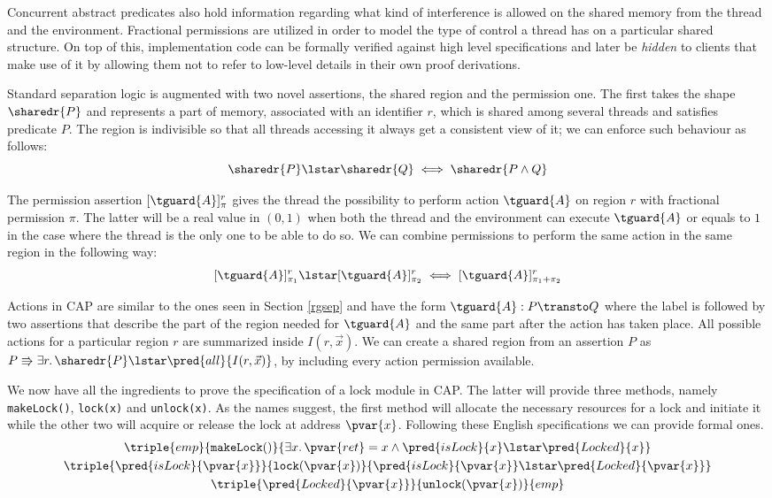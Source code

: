 Concurrent abstract predicates also hold information regarding what kind of interference is allowed on the shared memory from the thread and the environment. Fractional permissions \cite{fractional} are utilized in order to model the type of control a thread has on a particular shared structure. On top of this, implementation code can be formally verified against high level specifications and later be \textit{hidden} to clients that make use of it by allowing them not to refer to low-level details in their own proof derivations.

Standard separation logic is augmented with two novel assertions, the shared region and the permission one. The first takes the shape $\sharedr{P}$ and represents a part of memory, associated with an identifier $r$, which is shared among several threads and satisfies predicate $P$. The region is indivisible so that all threads accessing it always get a consistent view of it; we can enforce such behaviour as follows:
\[
	\sharedr{P} \lstar \sharedr{Q} \iff \sharedr{P \land Q}
\]

The permission assertion $[\tguard{A}]_\pi^r$ gives the thread the possibility to perform action $\tguard{A}$ on region $r$ with fractional permission $\pi$. The latter will be a real value in $(0, 1)$ when both the thread and the environment can execute $\tguard{A}$ or equals to $1$ in the case where the thread is the only one to be able to do so. We can combine permissions to perform the same action in the same region in the following way:
\[
	[\tguard{A}]_{\pi_1}^r \lstar [\tguard{A}]_{\pi_2}^r \iff [\tguard{A}]_{\pi_1 + \pi_2}^r
\]

Actions in CAP are similar to the ones seen in Section \ref{rgsep} and have the form $\tguard{A}: P \transto Q$ where the label is followed by two assertions that describe the part of the region needed for $\tguard{A}$ and the same part after the action has taken place. All possible actions for a particular region $r$ are summarized inside $I(r, \vec{x})$. We can create a shared region from an assertion $P$ as $P \Rrightarrow \exists r \ldotp \sharedr{P} \lstar \pred{all}{I(r, \vec{x})}$, by including every action permission available.

We now have all the ingredients to prove the specification \cite{cap} of a lock module in CAP. The latter will provide three methods, namely \texttt{makeLock()}, \texttt{lock(x)} and \texttt{unlock(x)}. As the names suggest, the first method will allocate the necessary resources for a lock and initiate it while the other two will acquire or release the lock at address $\pvar{x}$. Following these English specifications we can provide formal ones.
\begin{gather*}
\triple
{emp}
{\mathtt{makeLock}()}
{\exists x \ldotp \pvar{ret} = x \land \pred{isLock}{x} \lstar \pred{Locked}{x}}
\\
\triple
{\pred{isLock}{\pvar{x}}}
{\mathtt{lock}(\pvar{x})}
{\pred{isLock}{\pvar{x}} \lstar \pred{Locked}{\pvar{x}}}
\\
\triple
{\pred{Locked}{\pvar{x}}}
{\mathtt{unlock}(\pvar{x})}
{emp}
\end{gather*}

